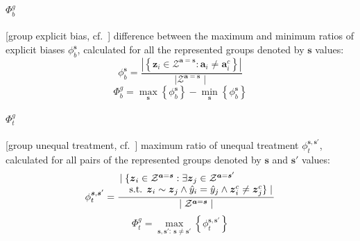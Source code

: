\documentclass[letterpaper]{article} %
\begin{document}
	
\paragraph{$\Phi_b^g$} [group explicit bias, cf.\ ] difference between the maximum and minimum ratios of explicit biases $\phi_b^{\boldsymbol{s}}$, calculated for all the represented groups denoted by $\boldsymbol{s}$ values:
%
$$\phi_b^{\boldsymbol{s}} = \frac{ | \left\{ \boldsymbol{z}_i \in \mathcal{Z}^{\boldsymbol{a}=\boldsymbol{s}} : \boldsymbol{a}_{i} \neq \boldsymbol{a}_{i}^{c} \right\} | }{\mid \mathcal{Z}^{\boldsymbol{a}=\boldsymbol{s}} \mid}$$
%
$$\Phi_b^g = \underset{\boldsymbol{s}}{\max} \left\{ \phi_b^{\boldsymbol{s}} \right\} - \underset{\boldsymbol{s}}{\min} \left\{ \phi_b^{\boldsymbol{s}} \right\} $$
	
\paragraph{$\Phi_t^g$} [group unequal treatment, cf.\ ] maximum ratio of unequal treatment $\phi_t^{\boldsymbol{s}, \boldsymbol{s}'}$, calculated for all pairs of the represented groups denoted by $\boldsymbol{s}$ and $\boldsymbol{s}'$ values:
%
$$\phi_t^{\boldsymbol{s}, \boldsymbol{s}'} = \frac{ \splitfrac{\mid \{ \boldsymbol{z}_i \in \mathcal{Z}^{\boldsymbol{a}=\boldsymbol{s}} : \exists \boldsymbol{z}_j \in \mathcal{Z}^{\boldsymbol{a}=\boldsymbol{s}'}}{\text{s.t. } \boldsymbol{z}_i \sim \boldsymbol{z}_j \wedge \hat{y}_i = \hat{y}_j \wedge \boldsymbol{z}_i^c \neq \boldsymbol{z}_j^c \} \mid}}{\mid \mathcal{Z}^{\boldsymbol{a}=\boldsymbol{s}} \mid}$$
%
$$\Phi_t^g = \underset{\boldsymbol{s}, \boldsymbol{s}' : ~ \boldsymbol{s} \neq \boldsymbol{s}'}{\max} \left\{ \phi_t^{\boldsymbol{s}, \boldsymbol{s}'} \right\}$$
\end{document}
